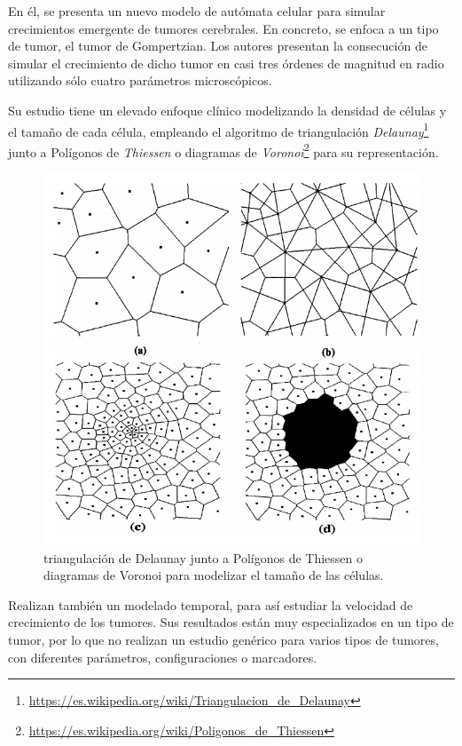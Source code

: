 En él, se presenta un nuevo modelo de autómata celular para simular crecimientos emergente de tumores cerebrales.
En concreto, se enfoca a un tipo de tumor, el tumor de Gompertzian. Los autores presentan
la consecución de simular el crecimiento de dicho tumor en casi tres órdenes de magnitud en radio
utilizando sólo cuatro parámetros microscópicos.

Su estudio tiene un elevado enfoque clínico modelizando la densidad de células y
el tamaño de cada célula, empleando el algoritmo de triangulación \textit{Delaunay}\footnote{\url{https://es.wikipedia.org/wiki/Triangulacion_de_Delaunay}}
junto a Polígonos de \textit{Thiessen} o diagramas de \textit{Voronoi}\footnote{\url{https://es.wikipedia.org/wiki/Poligonos_de_Thiessen}} para su representación.

\begin{figure}[h]
\centering
\includegraphics[scale=0.7]{figures/modelado_tamanio}
\caption{triangulación de Delaunay junto a Polígonos de Thiessen o diagramas de Voronoi para modelizar el tamaño de las células.}
\end{figure}

Realizan también un modelado temporal, para así estudiar la velocidad de crecimiento de los tumores.
Sus resultados están muy especializados en un tipo de tumor, por lo que no realizan un estudio genérico
para varios tipos de tumores, con diferentes parámetros, configuraciones o marcadores.

